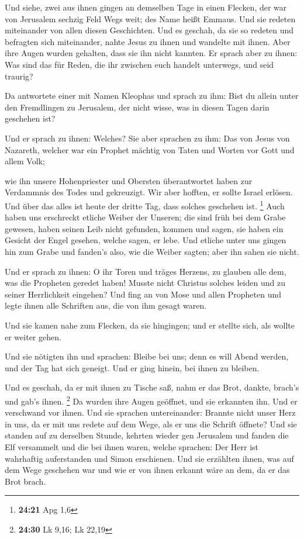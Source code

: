  Und siehe, zwei aus ihnen gingen an demselben Tage in
einen Flecken, der war von Jerusalem sechzig Feld Wegs weit; des Name
heißt Emmaus.  Und sie redeten miteinander von allen
diesen Geschichten.  Und es geschah, da sie so redeten
und befragten sich miteinander, nahte Jesus zu ihnen und wandelte mit
ihnen.  Aber ihre Augen wurden gehalten, dass sie ihn
nicht kannten.  Er sprach aber zu ihnen: Was sind das für
Reden, die ihr zwischen euch handelt unterwegs, und seid traurig?

 Da antwortete einer mit Namen Kleophas und sprach zu
ihm: Bist du allein unter den Fremdlingen zu Jerusalem, der nicht wisse,
was in diesen Tagen darin geschehen ist?

 Und er sprach zu ihnen: Welches? Sie aber sprachen zu
ihm: Das von Jesus von Nazareth, welcher war ein Prophet mächtig von
Taten und Worten vor Gott und allem Volk;

 wie ihn unsere Hohenpriester und Obersten überantwortet
haben zur Verdammnis des Todes und gekreuzigt.  Wir aber
hofften, er sollte Israel erlösen. Und über das alles ist heute der
dritte Tag, dass solches geschehen ist. \footnote{\textbf{24:21} Apg 1,6}
 Auch haben uns erschreckt etliche Weiber der Unseren;
die sind früh bei dem Grabe gewesen,  haben seinen Leib
nicht gefunden, kommen und sagen, sie haben ein Gesicht der Engel
gesehen, welche sagen, er lebe.  Und etliche unter uns
gingen hin zum Grabe und fanden's also, wie die Weiber sagten; aber ihn
sahen sie nicht.

 Und er sprach zu ihnen: O ihr Toren und träges Herzens,
zu glauben alle dem, was die Propheten geredet haben! 
Musste nicht Christus solches leiden und zu seiner Herrlichkeit
eingehen?  Und fing an von Mose und allen Propheten und
legte ihnen alle Schriften aus, die von ihm gesagt waren.

 Und sie kamen nahe zum Flecken, da sie hingingen; und er
stellte sich, als wollte er weiter gehen.

 Und sie nötigten ihn und sprachen: Bleibe bei uns; denn
es will Abend werden, und der Tag hat sich geneigt. Und er ging hinein,
bei ihnen zu bleiben.

 Und es geschah, da er mit ihnen zu Tische saß, nahm er
das Brot, dankte, brach's und gab's ihnen. \footnote{\textbf{24:30} Lk
  9,16; Lk 22,19}  Da wurden ihre Augen geöffnet, und sie
erkannten ihn. Und er verschwand vor ihnen.  Und sie
sprachen untereinander: Brannte nicht unser Herz in uns, da er mit uns
redete auf dem Wege, als er uns die Schrift öffnete?  Und
sie standen auf zu derselben Stunde, kehrten wieder gen Jerusalem und
fanden die Elf versammelt und die bei ihnen waren, 
welche sprachen: Der Herr ist wahrhaftig auferstanden und Simon
erschienen.  Und sie erzählten ihnen, was auf dem Wege
geschehen war und wie er von ihnen erkannt wäre an dem, da er das Brot
brach.

